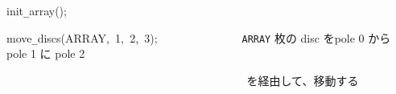 \documentclass[a4paper,10pt]{article}
\def\mc{\relax}
\begin{document}
\noindent
\mbox{}\hfill

\noindent
\mbox{}init{\tt\_}array();

\noindent
\mbox{}move{\tt\_}discs(ARRAY,{\tt\mc \ }1,{\tt\mc \ }2,{\tt\mc \ }3);{\tt\mc \ }{\tt\mc \ }{\tt\mc \ }{\tt\mc \ }{\tt\mc \ }{\tt\mc \ }{\tt\mc \ }{\tt\mc \ }{\tt\mc \ }{\tt\mc \ }{\tt\mc \ }{\tt\mc \ }{\tt\mc \ }\rm\mc {\tt\%} \ {\tt ARRAY} 枚の disc をpole 0 から pole 1 に pole 2\hfill
\tt\mc 

\noindent
\mbox{}{\tt\mc \ }{\tt\mc \ }{\tt\mc \ }{\tt\mc \ }{\tt\mc \ }{\tt\mc \ }{\tt\mc \ }{\tt\mc \ }{\tt\mc \ }{\tt\mc \ }{\tt\mc \ }{\tt\mc \ }{\tt\mc \ }{\tt\mc \ }{\tt\mc \ }{\tt\mc \ }{\tt\mc \ }{\tt\mc \ }{\tt\mc \ }{\tt\mc \ }{\tt\mc \ }{\tt\mc \ }{\tt\mc \ }{\tt\mc \ }{\tt\mc \ }{\tt\mc \ }{\tt\mc \ }{\tt\mc \ }{\tt\mc \ }{\tt\mc \ }{\tt\mc \ }{\tt\mc \ }{\tt\mc \ }{\tt\mc \ }{\tt\mc \ }{\tt\mc \ }{\tt\mc \ }{\tt\mc \ }{\tt\mc \ }{\tt\mc \ }\rm\mc {\tt\%} \ を経由して、移動する \hfill

\tt\mc 

\rm\mc
\end{document}
